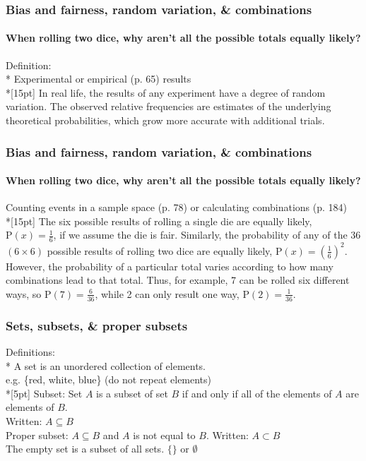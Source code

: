 \documentclass{beamer}
\begin{document}
\frame
{
  \frametitle{Bias and fairness, random variation, \& combinations}
  \framesubtitle{When rolling two dice, why aren't all the possible totals equally likely?}
  Definition:\\*
  \alert{Experimental} or \alert{empirical} (p. 65) results \\*[15pt]
  In real life, the results of any experiment have a degree of \alert{random variation}. The observed relative frequencies are estimates of the underlying theoretical probabilities, which grow more accurate with additional trials.
  
}

\frame
{
  \frametitle{Bias and fairness, random variation, \& combinations}
  \framesubtitle{When rolling two dice, why aren't all the possible totals equally likely?}
  Counting events in a \alert{sample space} (p. 78) or calculating \alert{combinations} (p. 184) \\*[15pt]
  The six possible results of rolling a single die are equally likely, $\mathrm P(x)=\frac{1}{6}$, if we assume the die is fair. Similarly, the probability of any of the 36 $(6 \times 6)$ possible results of rolling two dice are equally likely, $\mathrm P(x)=(\frac{1}{6})^2$. However, the probability of a particular total varies according to how many combinations lead to that total. Thus, for example, 7 can be rolled six different ways, so $\mathrm P(7)=\frac{6}{36}$, while 2 can only result one way, $\mathrm P(2)=\frac{1}{36}$.
  
}

\frame
{
  \frametitle{Sets, subsets, \& proper subsets}
  
  Definitions:\\*
  A \alert{set} is an unordered collection of elements.\\ e.g. \{red, white, blue\} (do not repeat elements)\\*[5pt]
  \alert{Subset}: Set $A$ is a subset of set $B$ if and only if all of the elements of $A$ are elements of $B$.\\
  Written: $A \subseteq B$\\[5pt]
  \alert{Proper subset}: $A \subseteq B$ and $A$ is not equal to $B$. Written: $A \subset B$\\[5pt]
  The \alert{empty set} is a subset of all sets. $\{\} \text{ or } \emptyset$
  
}
\end{document}
